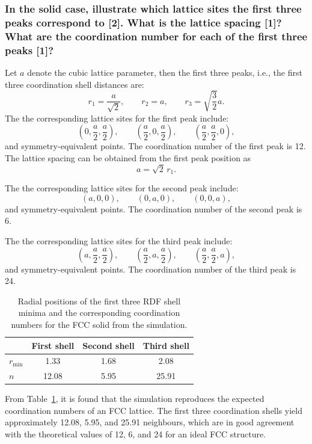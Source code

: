 \documentclass[a4paper,10pt,twocolumn]{article}
\begin{document}
\subsubsection*{In the solid case, illustrate which lattice sites the first three peaks correspond to [2]. What is the lattice spacing [1]? What are the coordination number for each of the first three peaks [1]?}
Let $a$ denote the cubic lattice parameter, then the first three peaks, i.e., the first three coordination shell distances are:
\[
r_1=\frac{a}{\sqrt2},\qquad r_2=a,\qquad r_3=\sqrt{\frac{3}{2}}a.
\]
The the corresponding lattice sites for the first peak include:
\[
\left(0,\frac{a}{2},\frac{a}{2}\right),\qquad \left(\frac{a}{2},0,\frac{a}{2}\right),\qquad \left(\frac{a}{2},\frac{a}{2},0\right),
\]
and symmetry-equivalent points. The coordination number of the first peak is 12. The lattice spacing can be obtained from the first peak position as
\[
a=\sqrt{2}\,r_1 .
\]

The the corresponding lattice sites for the second peak include:
\[
\left(a,0,0\right),\qquad \left(0,a,0\right),\qquad \left(0,0,a\right),
\]
and symmetry-equivalent points. The coordination number of the second peak is 6.

The the corresponding lattice sites for the third peak include:
\[
\left(a,\frac{a}{2},\frac{a}{2}\right),\qquad
\left(\frac{a}{2},a,\frac{a}{2}\right),\qquad
\left(\frac{a}{2},\frac{a}{2},a\right),
\]
and symmetry-equivalent points. The coordination number of the third peak is 24.

\begin{table}[H]
\centering
\caption{Radial positions of the first three RDF shell minima and the corresponding coordination numbers for the FCC solid from the simulation.}
\label{tab:fcc_shells}
\begin{tabular}{lccc}
\toprule
 & First shell & Second shell & Third shell \\
\midrule
$r_{\min}$ & 1.33 & 1.68 & 2.08 \\
$n$ & 12.08 & 5.95 & 25.91 \\
\bottomrule
\end{tabular}
\end{table}

From Table~\ref{tab:fcc_shells}, it is found that the simulation reproduces the expected coordination numbers of an FCC lattice. The first three coordination shells yield approximately 12.08, 5.95, and 25.91 neighbours, which are in good agreement with the theoretical values of 12, 6, and 24 for an ideal FCC structure.
\end{document}

